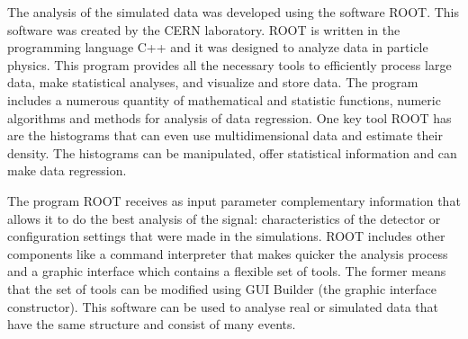 The analysis of the simulated data was developed using the software ROOT. This software was created by the CERN laboratory. ROOT is written in the programming language C++ and it was 
designed to analyze data in particle physics. This program provides all the necessary tools to efficiently process large data, make statistical analyses, and visualize and store data. The program 
includes a numerous quantity of mathematical and statistic functions, numeric algorithms and methods for analysis of data regression. One key tool ROOT has are the histograms that can even use multidimensional data and estimate their density. The histograms can be manipulated, offer statistical information and can make data regression. 

The program ROOT receives as input parameter complementary information that allows it to do the best analysis of the signal: characteristics of the detector or configuration settings that were made in the simulations. ROOT includes other components like a command interpreter that makes quicker the analysis process and a graphic interface which contains a flexible set of tools. The former means that the set of tools can be modified using GUI Builder (the graphic interface constructor). This software can be used to analyse real or simulated data that have the same structure and consist of many events. 